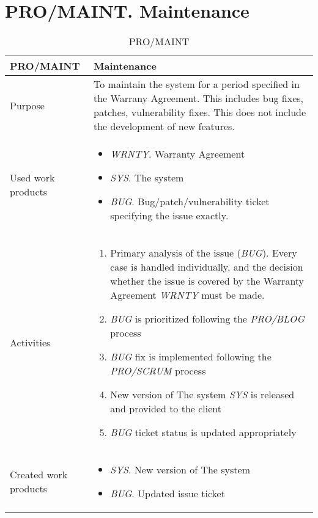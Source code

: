 \section{PRO/MAINT. Maintenance}
\begin{table}[]
\begin{tabular}{l|p{}}
\hline
\textbf{PRO/MAINT}    & \textbf{Maintenance} \\ \hline
Purpose &  To maintain the system for a period specified in the Warrany Agreement. This includes bug fixes, patches, vulnerability fixes. This does not include the development of new features. \\ \hline
Used work products    &      
\begin{itemize}
    \item \textit{WRNTY}. Warranty Agreement
    \item \textit{SYS}. The system
    \item \textit{BUG}. Bug/patch/vulnerability ticket specifying the issue exactly.
\end{itemize}
\\ \hline
Activities            &   
\begin{enumerate}
    \item Primary analysis of the issue (\textit{BUG}). Every case is handled individually, and the decision whether the issue is covered by the Warranty Agreement \textit{WRNTY} must be made.
    \item \textit{BUG} is prioritized following the \textit{PRO/BLOG} process
    \item \textit{BUG} fix is implemented following the \textit{PRO/SCRUM} process
    \item New version of The system \textit{SYS} is released and provided to the client
    \item \textit{BUG} ticket status is updated appropriately
\end{enumerate}
\\ \hline
Created work products &     
\begin{itemize}
    \item \textit{SYS}. New version of The system
    \item \textit{BUG}. Updated issue ticket
\end{itemize}
\end{tabular}
\caption{PRO/MAINT}
\label{pro/MAINT}
\end{table}


